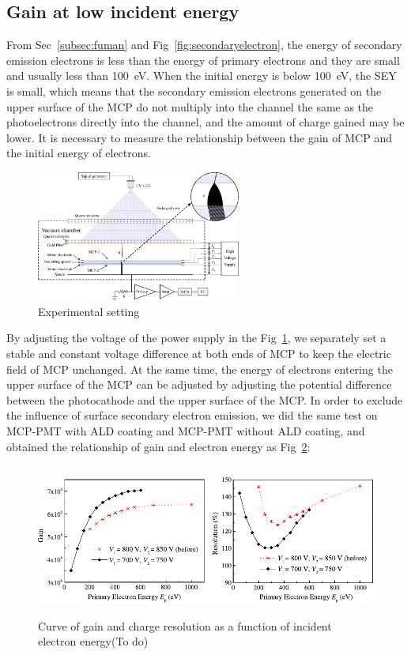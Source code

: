 \documentclass{article}
\begin{document}
\subsection{Gain at low incident energy}\label{sec:gain}
From Sec~\ref{subsec:fuman} and Fig~\ref{fig:secondaryelectron},
the energy of secondary emission electrons is less than the energy of primary electrons and
they are small and usually less than \SI{100}{eV}.
When the initial energy is below \SI{100}{eV}, the SEY is small,
which means that the secondary emission electrons generated on the upper surface of the MCP
do not multiply into the channel the same as the photoelectrons directly into the channel,
and the amount of charge gained may be lower. It is necessary to measure the relationship between the gain of MCP
and the initial energy of electrons.
\begin{figure}[ht]
    \centering
    \includegraphics[width=0.6\textwidth]{pic/gain_ep_exp.pdf}
    \caption{Experimental setting}\label{fig:gain_exp}
\end{figure}
By adjusting the voltage of the power supply in the Fig~\ref{fig:gain_exp},
we separately set a stable and constant voltage difference at both ends of MCP to keep the electric field of MCP unchanged.
At the same time, the energy of electrons entering the upper surface of the MCP can be adjusted by
adjusting the potential difference between the photocathode and the upper surface of the MCP.
In order to exclude the influence of surface secondary electron emission,
we did the same test on MCP-PMT with ALD coating and MCP-PMT without ALD coating,
and obtained the relationship of gain and electron energy as Fig~\ref{fig:gaintest}:
\begin{figure}[ht]
    \centering
    \includegraphics[height=5cm]{pic/gain_ep.pdf}
    \caption{Curve of gain and charge resolution as a function of incident electron energy(To do)}\label{fig:gaintest}
\end{figure}
\end{document}
